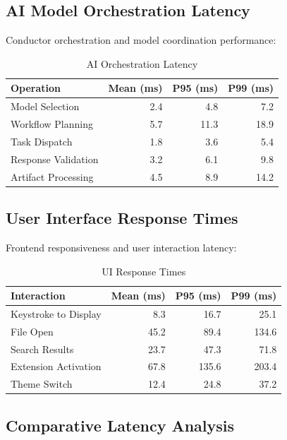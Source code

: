 \subsection*{AI Model Orchestration Latency}

Conductor orchestration and model coordination performance:

\begin{table}[ht]
\centering
\caption{AI Orchestration Latency}
\label{tab:ai-latency}
\begin{tabular}{@{}lrrr@{}}
\toprule
\textbf{Operation} & \textbf{Mean (ms)} & \textbf{P95 (ms)} & \textbf{P99 (ms)} \\
\midrule
Model Selection & 2.4 & 4.8 & 7.2 \\
Workflow Planning & 5.7 & 11.3 & 18.9 \\
Task Dispatch & 1.8 & 3.6 & 5.4 \\
Response Validation & 3.2 & 6.1 & 9.8 \\
Artifact Processing & 4.5 & 8.9 & 14.2 \\
\bottomrule
\end{tabular}
\end{table}

\subsection*{User Interface Response Times}

Frontend responsiveness and user interaction latency:

\begin{table}[ht]
\centering
\caption{UI Response Times}
\label{tab:ui-latency}
\begin{tabular}{@{}lrrr@{}}
\toprule
\textbf{Interaction} & \textbf{Mean (ms)} & \textbf{P95 (ms)} & \textbf{P99 (ms)} \\
\midrule
Keystroke to Display & 8.3 & 16.7 & 25.1 \\
File Open & 45.2 & 89.4 & 134.6 \\
Search Results & 23.7 & 47.3 & 71.8 \\
Extension Activation & 67.8 & 135.6 & 203.4 \\
Theme Switch & 12.4 & 24.8 & 37.2 \\
\bottomrule
\end{tabular}
\end{table}

\subsection*{Comparative Latency Analysis}


